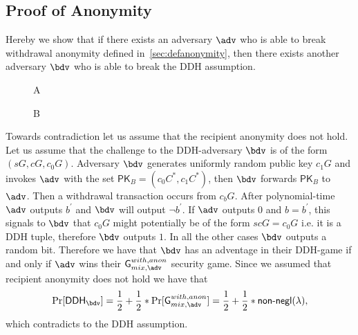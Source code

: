 \documentclass[a4paper]{article}
\theoremstyle{definition}
\begin{document}
\begin{appendices}

\section{Proof of Anonymity}
Hereby we show that if there exists an adversary $\adv$ who is able to break withdrawal anonymity defined in~\ref{sec:defanonymity}, then there exists another adversary $\bdv$ who is able to break the DDH assumption.

\begin{figure}
	\centering
\begin{bbrenv}{A}
 \begin{bbrbox} [name=\bdv]

 \begin{bbrenv}{B}
 \begin{bbrbox}[name=\adv]
 \end{bbrbox}
 
 \end{bbrenv}
 
 \end{bbrbox}
 
\end{bbrenv}

\end{figure}

Towards contradiction let us assume that the recipient anonymity does not hold. Let us assume that the challenge to the DDH-adversary $\bdv$ is of the form $(sG,cG,c_{0}G)$. Adversary $\bdv$ generates uniformly random public key $c_{1}G$ and invokes $\adv$ with the set $\textsf{PK}_{B}=(c_{0}C^{*}, c_{1}C^{*})$, then $\bdv$ forwards $\textsf{PK}_{B}$ to $\adv$. Then a withdrawal transaction occurs from $c_{b}G$. After polynomial-time $\adv$ outputs $b^{'}$ and $\bdv$ will output $\lnot b^{'}$. If $\adv$ outputs $0$ and $b=b^{'}$, this signals to $\bdv$ that $c_{0}G$ might potentially be of the form $scG=c_{0}G$  i.e. it is a DDH tuple, therefore $\bdv$ outputs $1$. In all the other cases $\bdv$ outputs a random bit. Therefore we have that $\bdv$ has an adventage in their DDH-game if and only if $\adv$ wins their $\textsf{G}^{with, anon}_{mix, \adv}$ security game. Since we assumed that recipient anonymity does not hold we have that $$\Pr[\textsf{DDH}_{\bdv}]=\frac{1}{2}+\frac{1}{2}*\Pr[\textsf{G}^{with, anon}_{mix, \adv}]=\frac{1}{2}+\frac{1}{2}*\textsf{non-negl}(\lambda),$$ which contradicts to the DDH assumption.


\end{appendices}
\end{document}
